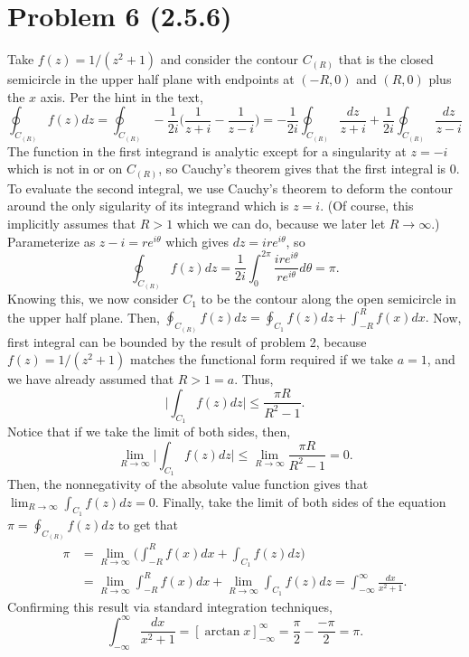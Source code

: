 \documentclass{article}
\begin{document}
\section{Problem 6 (2.5.6)} 
Take $f(z)=1/(z^2+1)$ and consider the contour $C_{(R)}$ that is the closed semicircle in the upper half plane with endpoints at $(-R,0)$ and $(R,0)$ plus the $x$ axis. Per the hint in the text, 
\[
\oint_{C_{(R)}}f(z)dz=\oint_{C_{(R)}}-\frac{1}{2i}\bigg(\frac{1}{z+i}-\frac{1}{z-i}\bigg)=-\frac{1}{2i}\oint_{C_{(R)}}\frac{dz}{z+i}+\frac{1}{2i}\oint_{C_{(R)}}\frac{dz}{z-i}
\]
The function in the first integrand is analytic except for a singularity at $z=-i$ which is not in or on $C_{(R)}$, so Cauchy's theorem gives that the first integral is 0. To evaluate the second integral, we use Cauchy's theorem to deform the contour around the only sigularity of its integrand which is $z=i$. (Of course, this implicitly assumes that $R>1$ which we can do, because we later let $R\to\infty$.) Parameterize as $z-i=re^{i\theta}$ which gives $dz=ire^{i\theta}$, so 
\[
\oint_{C_{(R)}}f(z)dz=\frac{1}{2i}\int_0^{2\pi}\frac{ire^{i\theta}}{re^{i\theta}}d\theta=\pi.
\]
Knowing this, we now consider $C_1$ to be the contour along the open semicircle in the upper half plane. Then, $\oint_{C_{(R)}}f(z)dz=\oint_{C_1}f(z)dz+\int_{-R}^Rf(x)dx.$ Now, first integral can be bounded by the result of problem 2, because $f(z)=1/(z^2+1)$ matches the functional form required if we take $a=1$, and we have already assumed that $R>1=a$. Thus, 
\[
\bigg|\int_{C_1} f(z)dz\bigg|\leq \frac{\pi R}{R^2-1}.
\]
Notice that if we take the limit of both sides, then, 
\[
\lim_{R\to\infty}\bigg|\int_{C_1} f(z)dz\bigg|\leq\lim_{R\to\infty}\frac{\pi R}{R^2-1}=0.
\]
Then, the nonnegativity of the absolute value function gives that $\lim_{R\to\infty}\int_{C_1} f(z)dz=0$. Finally, take the limit of both sides of the equation $\pi=\oint_{C_{(R)}}f(z)dz$ to get that 
\[
\begin{split}
\pi&=\lim_{R\to\infty}\bigg(\int_{-R}^Rf(x)dx+\int_{C_1} f(z)dz\bigg)\\&=
\lim_{R\to\infty}\int_{-R}^Rf(x)dx+\lim_{R\to\infty}\int_{C_1} f(z)dz=\int_{-\infty}^\infty \frac{dx}{x^2+1}.
\end{split}
\]
Confirming this result via standard integration techniques, 
\[
\int_{-\infty}^\infty \frac{dx}{x^2+1}=\left[\arctan{x}\right]_{-\infty}^\infty=\frac{\pi}{2}-\frac{-\pi}{2}=\pi.
\]
\end{document}
